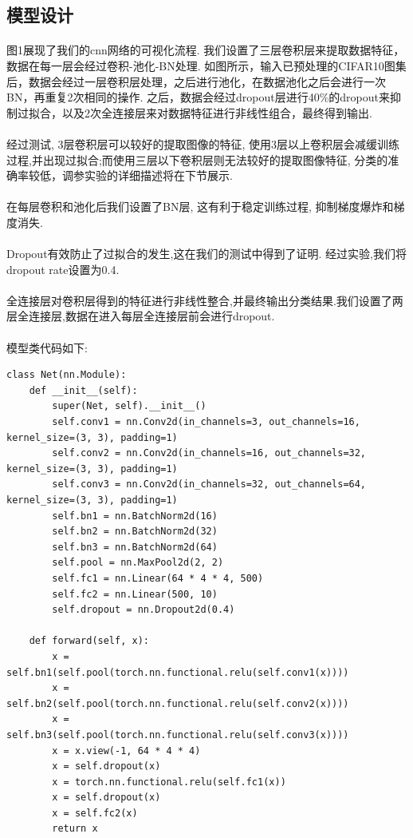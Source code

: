 \documentclass[11pt]{article}
\begin{document}
\subsection{模型设计}
\paragraph{}图1展现了我们的cnn网络的可视化流程. 我们设置了三层卷积层来提取数据特征，数据在每一层会经过卷积-池化-BN处理.
如图所示，输入已预处理的CIFAR10图集后，数据会经过一层卷积层处理，之后进行池化，在数据池化之后会进行一次BN，再重复2次相同的操作. 之后，数据会经过dropout层进行40\%的dropout来抑制过拟合，以及2次全连接层来对数据特征进行非线性组合，最终得到输出.
\paragraph{}经过测试, 3层卷积层可以较好的提取图像的特征, 使用3层以上卷积层会减缓训练过程,并出现过拟合;而使用三层以下卷积层则无法较好的提取图像特征, 分类的准确率较低，调参实验的详细描述将在下节展示.
\paragraph{}在每层卷积和池化后我们设置了BN层, 这有利于稳定训练过程, 抑制梯度爆炸和梯度消失.
\paragraph{}Dropout有效防止了过拟合的发生,这在我们的测试中得到了证明. 经过实验,我们将dropout rate设置为0.4.
\paragraph{}全连接层对卷积层得到的特征进行非线性整合,并最终输出分类结果.我们设置了两层全连接层,数据在进入每层全连接层前会进行dropout.
\paragraph{}模型类代码如下:
\begin{verbatim}
class Net(nn.Module):
    def __init__(self):
        super(Net, self).__init__()
        self.conv1 = nn.Conv2d(in_channels=3, out_channels=16, kernel_size=(3, 3), padding=1)
        self.conv2 = nn.Conv2d(in_channels=16, out_channels=32, kernel_size=(3, 3), padding=1)
        self.conv3 = nn.Conv2d(in_channels=32, out_channels=64, kernel_size=(3, 3), padding=1)
        self.bn1 = nn.BatchNorm2d(16)
        self.bn2 = nn.BatchNorm2d(32)
        self.bn3 = nn.BatchNorm2d(64)
        self.pool = nn.MaxPool2d(2, 2)
        self.fc1 = nn.Linear(64 * 4 * 4, 500)
        self.fc2 = nn.Linear(500, 10)
        self.dropout = nn.Dropout2d(0.4)

    def forward(self, x):
        x = self.bn1(self.pool(torch.nn.functional.relu(self.conv1(x))))
        x = self.bn2(self.pool(torch.nn.functional.relu(self.conv2(x))))
        x = self.bn3(self.pool(torch.nn.functional.relu(self.conv3(x))))
        x = x.view(-1, 64 * 4 * 4)
        x = self.dropout(x)
        x = torch.nn.functional.relu(self.fc1(x))
        x = self.dropout(x)
        x = self.fc2(x)
        return x
\end{verbatim}
\end{document}
